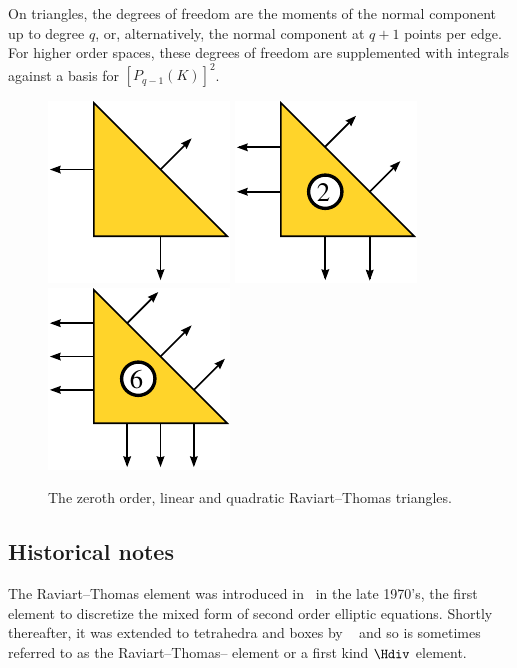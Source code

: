 On triangles, the degrees of freedom are the moments of the normal
component up to degree \( q \), or, alternatively, the normal
component at \( q + 1 \) points per edge. For higher order spaces,
these degrees of freedom are supplemented with integrals against a
basis for \( [P_{q-1}(K)]^2 \).

\begin{figure}[h]
  \begin{center}
    \includegraphics[width=\smallfig]{chapters/kirby-6/pdf/RT0.pdf}
    \includegraphics[width=\smallfig]{chapters/kirby-6/pdf/RT1.pdf}
    \includegraphics[width=\smallfig]{chapters/kirby-6/pdf/RT2.pdf}
    \caption{The zeroth order, linear and quadratic Raviart--Thomas
      triangles.}
  \end{center}
\end{figure}

\subsection{Historical notes}

The Raviart--Thomas element was introduced in~\cite{RaviartThomas1977}
in the late 1970's, the first element to discretize the mixed form of
second order elliptic equations. Shortly thereafter, it was extended
to tetrahedra and boxes by \nedelec{}~\cite{Nedelec1980} and so is
sometimes referred to as the Raviart--Thomas--\nedelec{} element or a
first kind $\Hdiv$ element.

